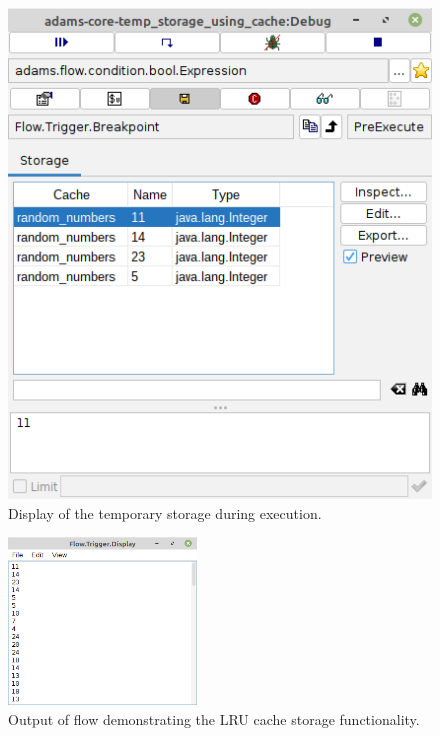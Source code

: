 \begin{figure}[htb]
  \centering
  \includegraphics[width=12.0cm]{images/floweditor-storage2_inspectionpanel.png}
  \caption{Display of the temporary storage during execution.}
  \label{floweditor-storage2_inspectionpanel}
\end{figure}

\begin{figure}[htb]
  \centering
  \includegraphics[width=5.0cm]{images/floweditor-storage2_output.png}
  \caption{Output of flow demonstrating the LRU cache storage
  functionality.}
  \label{floweditor-storage2_output}
\end{figure}


